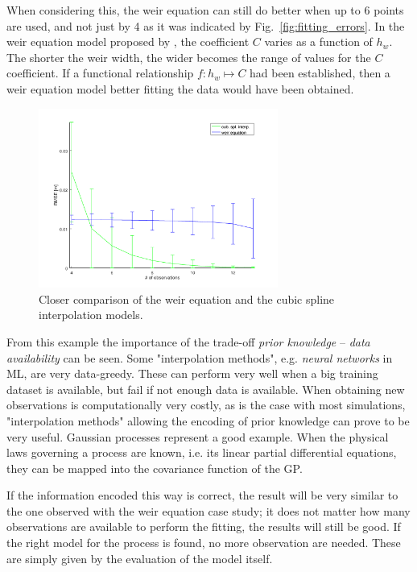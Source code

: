 When considering this, the weir equation can still do better when up to \num{6} points are used, and not just by \num{4} as it was indicated by Fig.~\ref{fig:fitting_errors}.
In the weir equation model proposed by \cite{brown_urban_2009}, the coefficient $C$ varies as a function of $h_w$.
The shorter the weir width, the wider becomes the range of values for the $C$ coefficient.
If a functional relationship $f:h_w \mapsto C$ had been established, then a weir equation model better fitting the data would have been obtained.


\begin{figure}[h]
  \centering
  \includegraphics[width=0.7\textwidth]{Figures/fitting_std.png}
  \caption{Closer comparison of the weir equation and the cubic spline interpolation models.}
  \label{fig:fitting_std}
\end{figure}


From this example the importance of the trade-off \emph{prior knowledge} -- \emph{data availability} can be seen.
Some "interpolation methods", e.g. \emph{neural networks} in ML, are very data-greedy.
These can perform very well when a big training dataset is available, but fail if not enough data is available.
When obtaining new observations is computationally very costly, as is the case with most simulations, "interpolation methods" allowing the encoding of prior knowledge can prove to be very useful.
Gaussian processes represent a good example.
When the physical laws governing a process are known, i.e. its linear partial differential equations, they can be mapped into the covariance function of the GP.

If the information encoded this way is correct, the result will be very similar to the one observed with the weir equation case study; it does not matter how many observations are available to perform the fitting, the results will still be good.
If the right model for the process is found, no more observation are needed.
These are simply given by the evaluation of the model itself.

